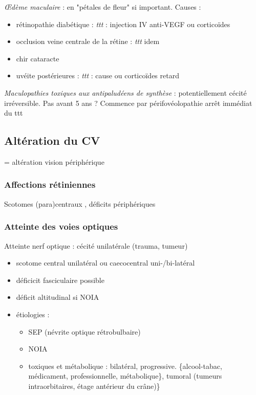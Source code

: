 \documentclass[11pt]{article}
\begin{document}
\emph{\OE{}dème maculaire} : en "pétales de fleur" si important. Causes : 
\begin{itemize}
\item rétinopathie diabétique : \emph{ttt} : injection IV anti-VEGF ou corticoïdes
\item occlusion veine centrale de la rétine : \emph{ttt} idem
\item chir cataracte
\item uvéite postérieures : \emph{ttt} : cause ou corticoïdes retard
\end{itemize}

\emph{Maculopathies toxiques aux antipaludéens de synthèse} : potentiellement cécité
irréversible. Pas avant 5 ans ? Commence par périfovéolopathie \thus arrêt
immédiat du ttt \danger

\subsection{Altération du CV}
\label{sec:org48c6c8c}
= altération vision périphérique

\subsubsection{Affections rétiniennes}
\label{sec:org5fd72ca}
Scotomes (para)centraux , déficits périphériques

\subsubsection{Atteinte des voies optiques}
\label{sec:org7a5e628}
Atteinte nerf optique : cécité unilatérale (trauma, tumeur) 
\begin{itemize}
\item scotome central unilatéral ou caecocentral uni-/bi-latéral
\item déficicit fasciculaire possible
\item déficit altitudinal si \gls{NOIA}
\item étiologies :
\begin{itemize}
\item SEP (névrite optique rétrobulbaire)
\item NOIA
\item toxiques et métabolique : bilatéral, progressive. \{alcool-tabac, médicament,
professionnelle, métabolique\}, tumoral (tumeurs intraorbitaires, étage
antérieur du crâne)\}
\end{itemize}
\end{itemize}
\end{document}
